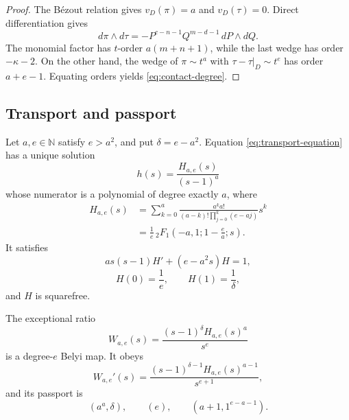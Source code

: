 \documentclass[11pt,reqno]{amsart}
\begin{document}
\begin{proof}
The Bézout relation gives \(v_D(\pi)=a\) and \(v_D(\tau)=0\).  Direct
differentiation gives
\[
d\pi\wedge d\tau
=-P^{c-n-1}Q^{m-d-1}\,dP\wedge dQ.
\]
The monomial factor has \(t\)-order \(a(m+n+1)\), while the last wedge has
order \(-\kappa-2\).  On the other hand, the wedge of
\(\pi\sim t^a\) with \(\tau-\tau|_D\sim t^e\) has order \(a+e-1\).
Equating orders yields \eqref{eq:contact-degree}.
\end{proof}

\subsection{Transport and passport}

\begin{theorem}
\label{thm:secondary}
Let \(a,e\in\mathbb N\) satisfy \(e>a^2\), and put
\(\delta=e-a^2\).  Equation \eqref{eq:transport-equation} has a unique
solution
\[
h(s)=\frac{H_{a,e}(s)}{(s-1)^a}
\]
whose numerator is a polynomial of degree exactly \(a\), where
\begin{align}
H_{a,e}(s)
&=\sum_{k=0}^a
\frac{a^k a!}{(a-k)!\prod_{j=0}^k(e-aj)}s^k
\label{eq:H-sum}\\
&=\frac1e\,{}_2F_1\!\left(-a,1;1-\frac ea;s\right).
\label{eq:H-hypergeometric}
\end{align}
It satisfies
\begin{equation}
\label{eq:H-ode}
as(s-1)H'+(e-a^2s)H=1,
\end{equation}
\[
H(0)=\frac1e,\qquad H(1)=\frac1\delta,
\]
and \(H\) is squarefree.

The exceptional ratio
\begin{equation}
\label{eq:secondary-W}
W_{a,e}(s)=\frac{(s-1)^\delta H_{a,e}(s)^a}{s^e}
\end{equation}
is a degree-\(e\) Belyi map.  It obeys
\begin{equation}
\label{eq:secondary-derivative}
W_{a,e}'(s)=
\frac{(s-1)^{\delta-1}H_{a,e}(s)^{a-1}}{s^{e+1}},
\end{equation}
and its passport is
\begin{equation}
\label{eq:secondary-passport}
(a^a,\delta),\qquad(e),\qquad(a+1,1^{e-a-1}).
\end{equation}
\end{theorem}
\end{document}
